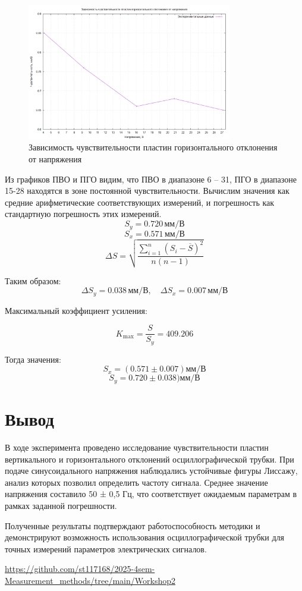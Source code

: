 \begin{figure}[ht!]
\centering
\includegraphics[width=0.8\textwidth]{SensHorizontal_graph.png}
\caption{Зависимость чувствительности пластин горизонтального отклонения от напряжения}
\label{fig:plot}
\end{figure}

Из графиков ПВО и ПГО видим, что ПВО в диапазоне 6 – 31, ПГО в диапазоне 15-28 находятся в зоне постоянной чувствительности. Вычислим значения как средние арифметические соответствующих измерений, и погрешность как стандартную погрешность этих измерений.
\[
S_y = 0.720\, \text{мм/В}
\]
\[
S_x = 0.571 \, \text{мм/В}
\]
\[
\Delta S = \sqrt{\frac{\sum_{i=1}^{n} (S_i - \overline{S})^2}{n(n-1)}}
\]

Таким образом:
\[
\Delta S_y = 0.038 \, \text{мм/В}, \quad \Delta S_x = 0.007 \, \text{мм/В}
\]

Максимальный коэффициент усиления:

\[
K_{\text{max}} = \frac{S}{S_y} = 409.206
\]

Тогда значения:
\[
S_x = (0.571{\pm}0.007) мм/В
\]
\[
S_y = 0.720{\pm}0.038) мм/В
\]


\section{Вывод}
В ходе эксперимента проведено исследование чувствительности пластин вертикального и горизонтального отклонений осциллографической трубки. При подаче синусоидального напряжения наблюдались устойчивые фигуры Лиссажу, анализ которых позволил определить частоту сигнала. Среднее значение напряжения составило 50 ± 0,5 Гц, что соответствует ожидаемым параметрам в рамках заданной погрешности.

Полученные результаты подтверждают работоспособность методики и демонстрируют возможность использования осциллографической трубки для точных измерений параметров электрических сигналов.

\begin{thebibliography}{9}

\url{https://github.com/st117168/2025-4sem-Measurement_methods/tree/main/Workshop2} 

\end{thebibliography}
\clearpage
\appendix